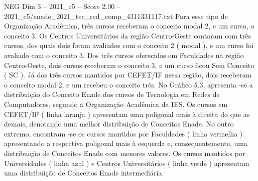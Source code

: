 \begin{textsample}{NEG Dim 3 – 2021\_c5 – Score 2.00 – 2021\_c5/enade\_2021\_tec\_red\_comp\_4311331117.txt}
Para esse tipo de Organização Acadêmica, três cursos receberam o conceito modal 2, e um curso, o conceito 3.
Os Centros Universitários da região Centro-Oeste contaram com três cursos, dos quais dois foram avaliados com o conceito 2 ( modal ), e um curso foi avaliado com o conceito 3.
Dos três cursos oferecidos em Faculdades na região Centro-Oeste, dois cursos receberam o conceito 3, e um curso ficou Sem Conceito ( SC ).
Já dos três cursos mantidos por CEFET/IF nessa região, dois receberam o conceito modal 2, e um recebeu o conceito três.
No Gráfico 5.3, apresenta -se a distribuição do Conceito Enade dos cursos de Tecnologia em Redes de Computadores, segundo a Organização Acadêmica da IES.
Os cursos em CEFET/IF ( linha laranja ) apresentam uma poligonal mais à direita do que as demais, denotando uma melhor distribuição de Conceitos Enade.
No outro extremo, encontram -se os cursos mantidos por Faculdades ( linha vermelha ) apresentando a respectiva poligonal mais à esquerda e, consequentemente, uma distribuição de Conceitos Enade com menores valores.
Os cursos mantidos por Universidades ( linha azul ) e Centros Universitários ( linha verde ) apresentam uma distribuição de Conceitos Enade intermediária.

\end{textsample}
